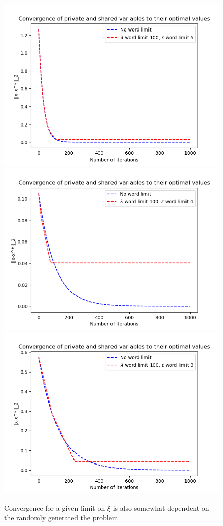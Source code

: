 \documentclass[12pt]{article}
\begin{document}
\begin{figure}[H]
	\centering
	\includegraphics[scale=0.5]{Problem4-Convergence8.png}
	\includegraphics[scale=0.5]{Problem4-Convergence9.png}
	\includegraphics[scale=0.5]{Problem4-Convergence10.png}
	\caption{Convergence for a given limit on $\xi$ is also somewhat dependent on the randomly generated the problem.}
\end{figure}
\end{document}
